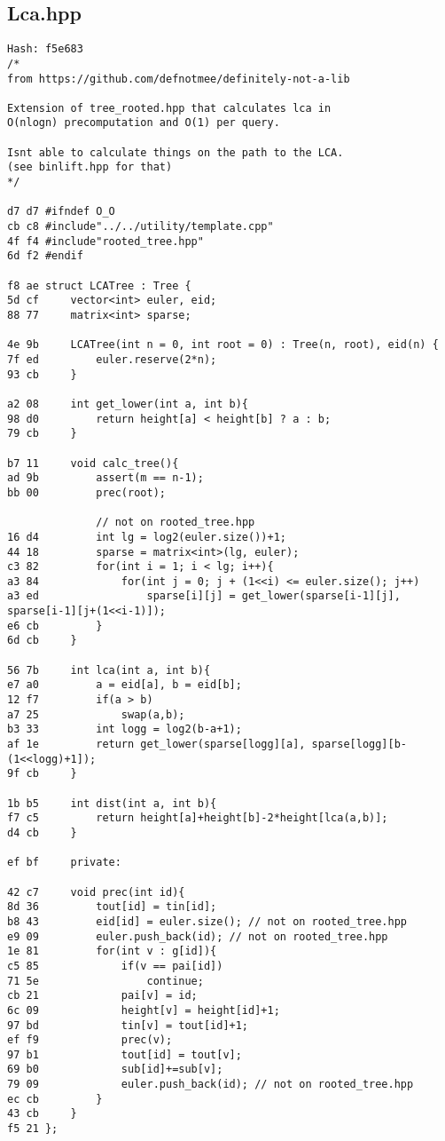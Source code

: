 \documentclass[11pt, a4paper, twoside]{article}
\begin{document}
\subsection{Lca.hpp}
\begin{lstlisting}
Hash: f5e683
/*
from https://github.com/defnotmee/definitely-not-a-lib

Extension of tree_rooted.hpp that calculates lca in
O(nlogn) precomputation and O(1) per query.

Isnt able to calculate things on the path to the LCA.
(see binlift.hpp for that)
*/

d7 d7 #ifndef O_O
cb c8 #include"../../utility/template.cpp"
4f f4 #include"rooted_tree.hpp"
6d f2 #endif

f8 ae struct LCATree : Tree {
5d cf     vector<int> euler, eid;
88 77     matrix<int> sparse;
          
4e 9b     LCATree(int n = 0, int root = 0) : Tree(n, root), eid(n) {
7f ed         euler.reserve(2*n);
93 cb     }
      
a2 08     int get_lower(int a, int b){
98 d0         return height[a] < height[b] ? a : b;
79 cb     }
      
b7 11     void calc_tree(){
ad 9b         assert(m == n-1);
bb 00         prec(root);
      
              // not on rooted_tree.hpp
16 d4         int lg = log2(euler.size())+1;
44 18         sparse = matrix<int>(lg, euler);
c3 82         for(int i = 1; i < lg; i++){
a3 84             for(int j = 0; j + (1<<i) <= euler.size(); j++)
a3 ed                 sparse[i][j] = get_lower(sparse[i-1][j], sparse[i-1][j+(1<<i-1)]);
e6 cb         }
6d cb     }
      
56 7b     int lca(int a, int b){
e7 a0         a = eid[a], b = eid[b];
12 f7         if(a > b)
a7 25             swap(a,b);
b3 33         int logg = log2(b-a+1);
af 1e         return get_lower(sparse[logg][a], sparse[logg][b-(1<<logg)+1]);
9f cb     }
      
1b b5     int dist(int a, int b){
f7 c5         return height[a]+height[b]-2*height[lca(a,b)];
d4 cb     }
      
ef bf     private:
      
42 c7     void prec(int id){
8d 36         tout[id] = tin[id];
b8 43         eid[id] = euler.size(); // not on rooted_tree.hpp
e9 09         euler.push_back(id); // not on rooted_tree.hpp
1e 81         for(int v : g[id]){
c5 85             if(v == pai[id])
71 5e                 continue;
cb 21             pai[v] = id;
6c 09             height[v] = height[id]+1;
97 bd             tin[v] = tout[id]+1;
ef f9             prec(v);
97 b1             tout[id] = tout[v];
69 b0             sub[id]+=sub[v];
79 09             euler.push_back(id); // not on rooted_tree.hpp
ec cb         }
43 cb     }
f5 21 };
\end{lstlisting}
\end{document}
